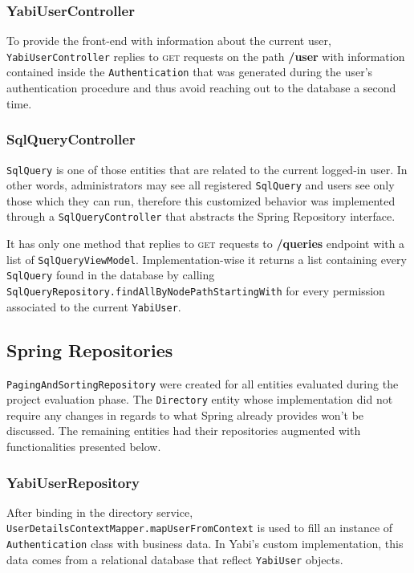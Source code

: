 \subsubsection{YabiUserController}
To provide the front-end with information about the current user, \texttt{YabiUserController} replies to \textsc{get} requests on the path \textbf{/user} with information contained inside the \texttt{Authentication} that was generated during the user's authentication procedure and thus avoid reaching out to the database a second time.

\subsubsection{SqlQueryController}
\texttt{SqlQuery} is one of those entities that are related to the current logged-in user. In other words, administrators may see all registered \texttt{SqlQuery} and users see only those which they can run, therefore this customized behavior was implemented through a \texttt{SqlQueryController} that abstracts the Spring Repository interface.

It has only one method that replies to \textsc{get} requests to \textbf{/queries} endpoint with a list of \texttt{SqlQueryViewModel}. Implementation-wise it returns a list containing every \texttt{SqlQuery} found in the database by calling \texttt{SqlQueryRepository.findAllByNodePathStartingWith} for every permission associated to the current \texttt{YabiUser}.

\subsection{Spring Repositories}\label{impl:repos}
\texttt{PagingAndSortingRepository} were created for all entities evaluated during the project evaluation phase.
The \texttt{Directory} entity whose implementation did not require any changes in regards to what Spring already provides won't be discussed.
The remaining entities had their repositories augmented with functionalities presented below.

\subsubsection{YabiUserRepository}
After binding in the directory service, \texttt{UserDetailsContextMapper.mapUserFromContext} is used to fill an instance of \texttt{Authentication} class with business data. In \gls{Yabi}'s custom implementation, this data comes from a relational database that reflect \texttt{YabiUser} objects.


